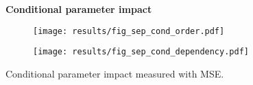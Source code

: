 \begin{figure}[htb!]
	\centering
	\textbf{Conditional parameter impact}\par\medskip
	\begin{subfigure}{.5\textwidth}
		\centering
		\texttt{[image: results/fig\_sep\_cond\_order.pdf]}
	\end{subfigure}%
	\begin{subfigure}{.5\textwidth}
		\centering
		\texttt{[image: results/fig\_sep\_cond\_dependency.pdf]}
		\captionsetup{width=0.9\linewidth}
	\end{subfigure}	
	\caption{Conditional parameter impact measured with MSE.}
	\label{fig:fig_sep_cond}
\end{figure}








